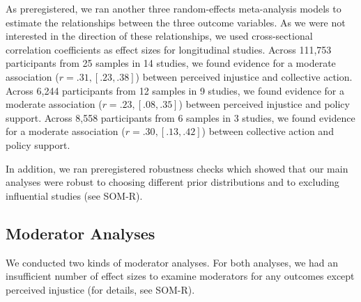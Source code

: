 \documentclass[twocolumn, 11pt, letterpaper]{article}
\begin{document}
As preregistered, we ran another three random-effects meta-analysis
models to estimate the relationships between the three outcome
variables. As we were not interested in the direction of these
relationships, we used cross-sectional correlation coefficients as
effect sizes for longitudinal studies. Across 111,753 participants from
25 samples in 14 studies, we found evidence for a moderate association
(\(r = .31, [.23, .38]\)) between perceived injustice and collective
action. Across 6,244 participants from 12 samples in 9 studies, we found
evidence for a moderate association (\(r = .23, [.08, .35]\)) between
perceived injustice and policy support. Across 8,558 participants from 6
samples in 3 studies, we found evidence for a moderate association
(\(r = .30, [.13, .42]\)) between collective action and policy support.

In addition, we ran preregistered robustness checks which showed that
our main analyses were robust to choosing different prior distributions
and to excluding influential studies (see SOM-R).

\hypertarget{moderator-analyses}{%
\subsection{Moderator Analyses}\label{moderator-analyses}}

We conducted two kinds of moderator analyses. For both analyses, we had
an insufficient number of effect sizes to examine moderators for any
outcomes except perceived injustice (for details, see SOM-R).
\end{document}
